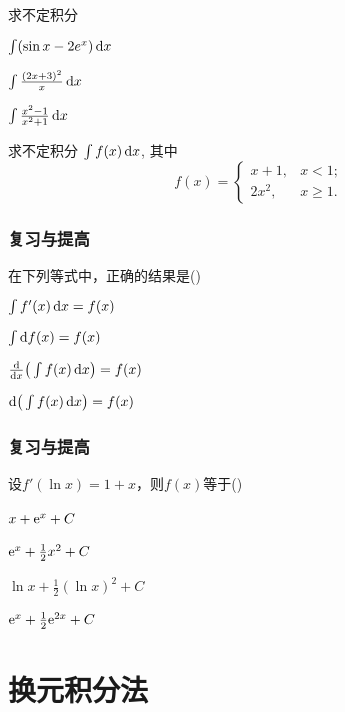 \documentclass[14pt,notheorems,leqno,xcolor={rgb}]{beamer} %
\begin{document}
\begin{frame}
\begin{review}
求不定积分
\begin{enumlite}
  \item $\int(\sin x - 2 e^x)\mathop{}\!\mathrm{d}{x}$
  \item $\int\frac{(2x+3)^2}{x}\mathop{}\!\mathrm{d}{x}$
  \pause
  \item $\int\frac{x^2-1}{x^2+1}\mathop{}\!\mathrm{d}{x}$
\end{enumlite}
\end{review}
\end{frame}

\begin{frame}
\begin{review}求不定积分 $\int f(x)\mathop{}\!\mathrm{d}{x}$, 其中
\[ f(x)=
\begin{cases}
x+1,  & x<1; \\
2x^2, & x\geq1.
\end{cases} \]
\end{review}
\end{frame}

\begin{frame}
\frametitle{复习与提高}
\begin{choice}
在下列等式中，正确的结果是\dotfill(\qquad)
\begin{choiceline}
  \item $\int f'(x)\mathop{}\!\mathrm{d} x=f(x)$
  \item $\int \mathop{}\!\mathrm{d} f(x)=f(x)$
  \item $\frac{\mathop{}\!\mathrm{d}}{\mathop{}\!\mathrm{d} x}\big(\int f(x)\mathop{}\!\mathrm{d} x\big)=f(x)$
  \item $\mathop{}\!\mathrm{d}\big(\int f(x)\mathop{}\!\mathrm{d} x\big)=f(x)$
\end{choiceline}
\end{choice}
\end{frame}

\begin{frame}
\frametitle{复习与提高}
\begin{choice}
设$f'(\ln x)=1+x$，则$f(x)$等于\dotfill(\qquad)
\begin{choicehalf}
  \item $x+\mathrm{e}^x+C$ ~
  \item $\mathrm{e}^x+\frac12x^2+C$ ~
  \item $\ln x+\frac12(\ln x)^2+C$ ~
  \item $\mathrm{e}^x+\frac12\mathrm{e}^{2x}+C$ ~
\end{choicehalf}
\end{choice}
\end{frame}

\section{换元积分法}
\end{document}
